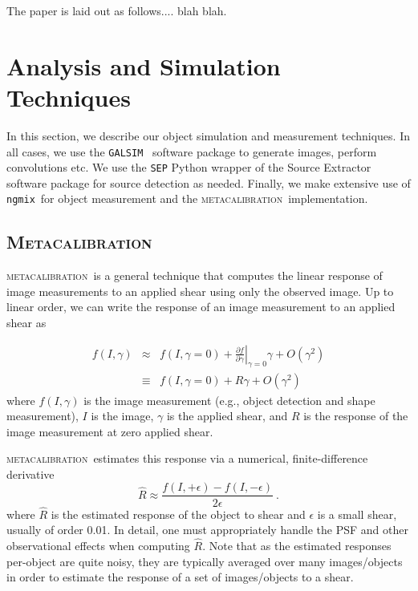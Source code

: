 \documentclass[fleqn,useAMS,usenatbib]{mnras}
\newcommand{\galsim}{\texttt{GALSIM}}
\newcommand{\ngmix}{\texttt{ngmix}}
\newcommand{\mcal}{\textsc{metacalibration}}
\begin{document}
The paper is laid out as follows.... blah blah.

\section{Analysis and Simulation Techniques}
\label{sec:sims}

In this section, we describe our object simulation and measurement techniques. In
all cases, we use the \galsim\ \citep{GALSIM2015} software package
to generate images, perform convolutions etc. We use the \texttt{SEP} \citep{sep}
Python wrapper of the Source Extractor software package \citep{Bertin96} for
source detection as needed. Finally, we make extensive use of \ngmix\
for object measurement and the \mcal\ implementation.

\subsection{\textsc{Metacalibration}}

\mcal\ is a general technique that computes the linear response of image measurements
to an applied shear using only the observed image. Up to linear order, we can
write the response of an image measurement to an applied shear as

\begin{eqnarray}
f(I, \gamma) & \approx & f(I, \gamma=0) + \left.\frac{\partial f}{\partial\gamma}\right|_{\gamma=0} \gamma + O(\gamma^2)\nonumber\\
&\equiv& f(I, \gamma=0) + R \gamma + O(\gamma^2)
\end{eqnarray}
where $f(I,\gamma)$ is the image measurement (e.g., object detection and shape
measurement), $I$ is the image, $\gamma$ is the applied shear, and $R$ is the response of the
image measurement at zero applied shear.

\mcal\ estimates this response via a
numerical, finite-difference derivative
\begin{displaymath}
  \hat{R} \approx \frac{f(I, +\epsilon) - f(I, -\epsilon)}{2\epsilon}\ .
\end{displaymath}
where $\hat{R}$ is the estimated response of the object to shear
and $\epsilon$ is a small shear, usually of order 0.01. In detail, one must
appropriately handle the PSF and other observational effects when computing
$\hat R$. Note that as the estimated responses per-object are quite noisy,
they are typically averaged over many images/objects in order to estimate
the response of a set of images/objects to a shear.
\end{document}
